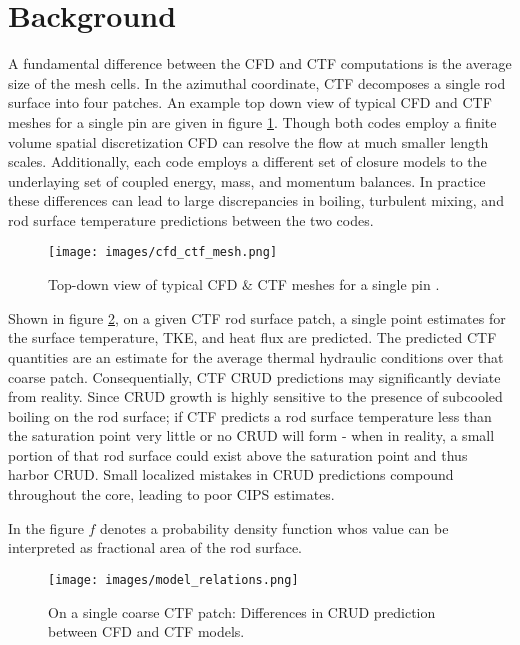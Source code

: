 \section{Background}

A fundamental difference between the CFD and CTF computations is the average size of the mesh cells.  In the azimuthal coordinate, CTF decomposes a single rod surface into four patches.  An example top down view of typical CFD and CTF meshes for a single pin are given in figure \ref{fig:cfd_ctf_mesh}.  Though both codes employ a finite volume spatial discretization CFD can resolve the flow at much smaller length scales.  Additionally, each code employs a different set of closure models to the underlaying set of coupled energy, mass, and momentum balances.  In practice these differences can lead to large discrepancies in boiling, turbulent mixing, and rod surface temperature predictions between the two codes.

\begin{figure}[!htbp]
\centering
\texttt{[image: images/cfd\_ctf\_mesh.png]}
\caption{Top-down view of typical CFD \& CTF meshes for a single pin \cite{salko12}.}
\label{fig:cfd_ctf_mesh}
\end{figure}

Shown in figure \ref{fig:model_overview}, on a given CTF rod surface patch, a single point estimates for the surface temperature, TKE, and heat flux are predicted.  The predicted CTF quantities are an estimate for the average thermal hydraulic conditions over that coarse patch.   Consequentially, CTF CRUD predictions may significantly deviate from reality.  Since CRUD growth is highly sensitive to the presence of subcooled boiling on the rod surface; if CTF predicts a rod surface temperature less than the saturation point very little or no CRUD will form - when in reality, a small portion of that rod surface could exist above the saturation point and thus harbor CRUD.  Small localized mistakes in CRUD predictions compound throughout the core, leading to poor CIPS estimates. 

In the figure $f$ denotes a probability density function whos value can be interpreted as fractional area of the rod surface.  
\begin{figure}[!htbp]
\centering
\texttt{[image: images/model\_relations.png]}
\caption{On a single coarse CTF patch: Differences in CRUD prediction between CFD and CTF models.}
\label{fig:model_overview}
\end{figure}

